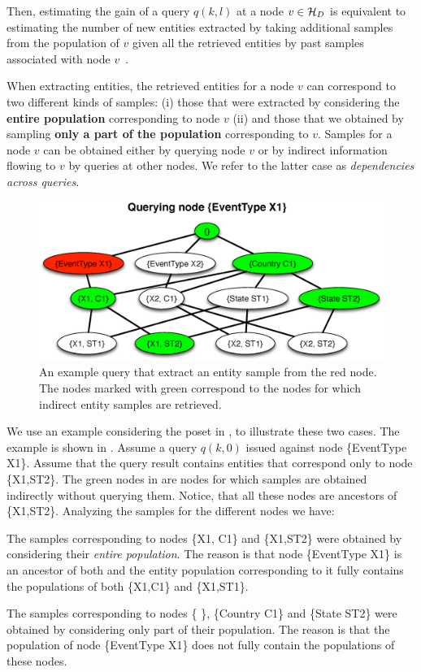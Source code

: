 Then, estimating the gain of a query $q(k,l)$ at a node $v \in \mathcal{H}_D$ is equivalent to estimating the number of new entities extracted by taking additional samples from the population of $v$ given all the retrieved entities by past samples associated with node $v$~\cite{trushkowsky:2013}. 

 When extracting entities,  the retrieved entities for a node $v$ can correspond to two different kinds of samples: (i) those that were extracted by considering the {\bf entire population} corresponding to node $v$ (ii) and those that we obtained by sampling {\bf only a part of the population} corresponding to $v$. Samples for a node $v$ can be obtained either by querying node $v$ or by indirect information flowing to $v$ by queries at other nodes. We refer to the latter case as {\em dependencies across queries}. 
\begin{figure}[h]
	\begin{center}
	\vspace{-10pt}
	\includegraphics[clip,scale=0.3]{figs/exampleQuery.eps}
	\caption{An example query that extract an entity sample from the red node. The nodes marked with green correspond to the nodes for which indirect entity samples are retrieved.}
	\label{fig:query}
	\vspace{-10pt}
	\end{center}
	\vspace{-5pt}
\end{figure}

We use an example considering the poset in , to illustrate these two cases. The example is shown in . Assume a query $q(k,0)$ issued against node \{EventType X1\}. Assume that the query result contains entities that correspond only to node \{X1,ST2\}. The green nodes in  are nodes for which samples are obtained indirectly without querying them. Notice, that all these nodes are ancestors of \{X1,ST2\}. Analyzing the samples for the different nodes we have:
\squishlist
\item The samples corresponding to nodes \{X1, C1\} and \{X1,ST2\} were obtained by considering their {\em entire population}. The reason is that node \{EventType X1\} is an ancestor of both and the entity population corresponding to it fully contains the populations of both \{X1,C1\} and \{X1,ST1\}. 
\item The samples corresponding to nodes \{ \}, \{Country C1\} and \{State ST2\} were obtained by considering only part of their population. The reason is that the population of node \{EventType X1\} does not fully contain the populations of these nodes. 
\squishend

